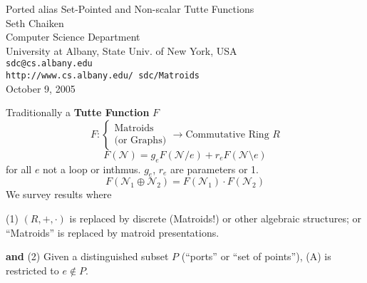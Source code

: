 \documentclass[%
  slidesonly,%
  semlayer,%
  amsmath
  ]{seminar}                                  %
\title{}
\author{}
\date{\today}
\begin{document}


\begin{slide}
\begin{center}
Ported alias Set-Pointed and Non-scalar Tutte Functions \\

Seth Chaiken\\
Computer Science Department\\[-0.8ex]
University at Albany, State Univ. of New York, USA\\[-0.8ex]
\texttt{sdc@cs.albany.edu}\\
\texttt{http://www.cs.albany.edu/~sdc/Matroids}\\

October 9, 2005

\end{center}
\end{slide}

\begin{slide}
Traditionally a \textbf{Tutte Function} $F$
\[
F:\left\{\begin{array}{l} \mbox{Matroids } \\ \mbox{(or Graphs)} \end{array}\right.
\rightarrow \mbox{Commutative Ring\ \ } R
\]
\begin{equation}
F(\mathcal{N}) = g_eF(\mathcal{N}/e) + r_eF(\mathcal{N}\setminus e)
\tag{A}
\end{equation}
for all $e$ not a loop or inthmus.  $g_e$, $r_e$ are parameters or 1.
\begin{equation}
F(\mathcal{N}_1\oplus\mathcal{N}_2)
=F(\mathcal{N}_1)\cdot F(\mathcal{N}_2)
\tag{M}
\end{equation}
We survey results where

\noindent (1) $(R,+,\cdot)$ is replaced by discrete (Matroids!) or
other algebraic structures; or ``Matroids'' is replaced by 
matroid presentations.

\noindent \textbf{and} (2) Given a distinguished subset $P$ (``ports'' or
``set of points''), (A) is restricted to $e\not\in P$.
\end{slide}
\end{document}
